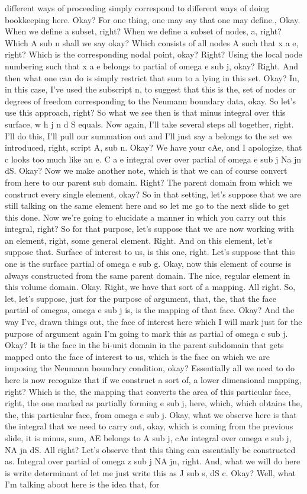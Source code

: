 \documentclass[10pt]{article}
\begin{document}
different ways of proceeding simply correspond to different ways of doing bookkeeping here. Okay? For one thing, one may say that one may define., Okay. When we define a subset, right? When we define a subset of nodes, a, right? Which A sub n shall we say okay? Which consists of all nodes A such that x a e, right? Which is the corresponding nodal point, okay? Right? Using the local node numbering such that x a e belongs to partial of omega e sub j, okay? Right. And then what one can do is simply restrict that sum to a lying in this set. Okay? In, in this case, I've used the subscript n, to suggest that this is the, set of nodes or degrees of freedom corresponding to the Neumann boundary data, okay. So let's use this approach, right? So what we see then is that minus integral over this surface, w h j n d S equals. Now again, I'll take several steps all together, right. I'll do this, I'll pull our summation out and I'll just say a belongs to the set we introduced, right, script A, sub n. Okay? We have your cAe, and I apologize, that c looks too much like an e. C a e integral over over partial of omega e sub j Na jn dS. Okay? Now we make another note, which is that we can of course convert from here to our parent sub domain. Right? The parent domain from which we construct every single element, okay? So in that setting, let's suppose that we are still talking on the same element here and so let me go to the next slide to get this done. Now we're going to elucidate a manner in which you carry out this integral, right? So for that purpose, let's suppose that we are now working with an element, right, some general element. Right. And on this element, let's suppose that. Surface of interest to us, is this one, right. Let's suppose that this one is the surface partial of omega e sub g. Okay, now this element of course is always constructed from the same parent domain. The nice, regular element in this volume domain. Okay. Right, we have that sort of a mapping. All right. So, let, let's suppose, just for the purpose of argument, that, the, that the face partial of omegas, omega e sub j is, is the mapping of that face. Okay? And the way I've, drawn things out, the face of interest here which I will mark just for the purpose of argument again I'm going to mark this as partial of omega c sub j. Okay? It is the face in the bi-unit domain in the parent subdomain that gets mapped onto the face of interest to us, which is the face on which we are imposing the Neumann boundary condition, okay? Essentially all we need to do here is now recognize that if we construct a sort of, a lower dimensional mapping, right? Which is the, the mapping that converts the area of this particular face, right, the one marked as partially forming e sub j, here, which, which obtains the, the, this particular face, from omega c sub j. Okay, what we observe here is that the integral that we need to carry out, okay, which is coming from the previous slide, it is minus, sum, AE belongs to A sub j, cAe integral over omega e sub j, NA jn dS. All right? Let's observe that this thing can essentially be constructed as. Integral over partial of omega z sub j NA jn, right. And, what we will do here is write determinant of let me just write this as J sub s, dS c. Okay? Well, what I'm talking about here is the idea that, for 
\end{document}
